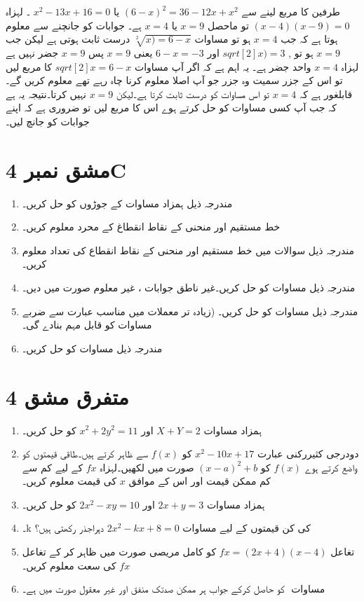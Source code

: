 \newpage
طرفين کا مربع لينے سے $  (6-x)^2=36-12x+x^2   $  يا $ x^2-13x+16=0 $  ۔ لہزاہ $ (x-4)(x-9)=0  $  تو ماحصل $ x=9 $ يا $  x =4  $ ہے۔ جوابات کو جانچنے سے معلوم ہوتا ہے کہ جب $ x=4 $ ہو تو مساوات $\sqrt[2]{x) = 6-x} $ درست ثابت ہوتی ہے ليکن جب $ x=9 $ ہو تو , $  sqrt[2]{x})=3 $ اور $  6-x=-3 $ يعنی $x=9 $ پس $x=9 $ جضر نہيں ہے لہزاہ $ x=4$ واحد جضر ہے۔ يہ اہم ہے کہ اگر آپ مساوات $  sqrt[2]{x} = 6-x  $   کا مربع ليں تو اس کے جزر سميت وہ جزر جو آپ اصلا معلوم کرنا چاہ رہے تھے معلوم کريں گے۔ قابلغور ہے کہ $ x=4 $ تو اس مساوات کو درست ثابت کرتا ہے۔ليکن $ x=9 $ نہيں کرتا۔نتيجہ يہ ہے کہ جب آپ کسی مساوات کو حل کرتے ہوے اس کا مربع ليں تو ضروری ہے کہ اپنے جوابات کو جانچ ليں۔

\section{مشق نمبر   4C}
\begin{enumerate}
\item
                                     مندرجہ ذيل ہمزاد مساوات کے جوڑوں کو حل کريں۔                               
\item
                                     خط مستقيم اور منحنی کے نقاط انقطاغ کے محرد معلوم کريں۔
\item
                                      مندرجہ ذيل سوالات ميں خط مستقيم اور منحنی کے نقاط انقطاع کی تعداد معلوم کريں۔
\item
    مندرجہ ذيل مساوات کو حل کريں۔غير ناطق جوابات ، غير معلوم صورت ميں ديں۔
\item
    مندرجہ ذيل مساوات کو حل کريں۔ (زيادہ تر معملات ميں مناسب عبارت سے ضربے مساوات کو قابل مہم بنادے گی۔
\item
    مندرجہ ذيل مساوات کو حل کريں۔
 \end{enumerate}   
 \section{   متفرق مشق 4  }
 \begin{enumerate}
\item
                                            ہمزاد مساوات $ X+Y=2 $ اور $  x^2+2y^2=11  $ کو حل کريں۔
\item
                                            دودرجی کثيررکنی عبارت $ x^2-10x+17  $ کو $  f(x)  $ سے ظاہر کرتے ہيں۔طاقی قيمتوں کو واضع کرتے ہوے $  f(x)  $ کو $ (x-a)^2+b $ صورت ميں لکھيں۔لہزاہ $  fx $  کے ليے کم سے کم ممکن قيمت اور اس کے موافق $  x $ کی قيمت معلوم کريں۔
\item
                                            ہمزاد مساوات $ 2x+y=3 $ اور $  2x^2-xy=10$ کو حل کريں۔
\item
                                           ۔k کی کن قيمتوں کے ليے مساوات  $ 2x^2-kx+8=0 $ دہراجذر رکھتی ہيں؟
\item
                                            تغاعل $ fx=(2x+4)(x-4) $ کو کامل مريصی صورت ميں ظاہر کر کے تغاعل $ fx$ کی سعت معلوم کريں۔
\item
                                            مساوات $ $ کو حاصل کرکے جواب ہر ممکن صدتک منفق اور غير معقول صورت ميں ہے۔
 \end{enumerate}    
    
